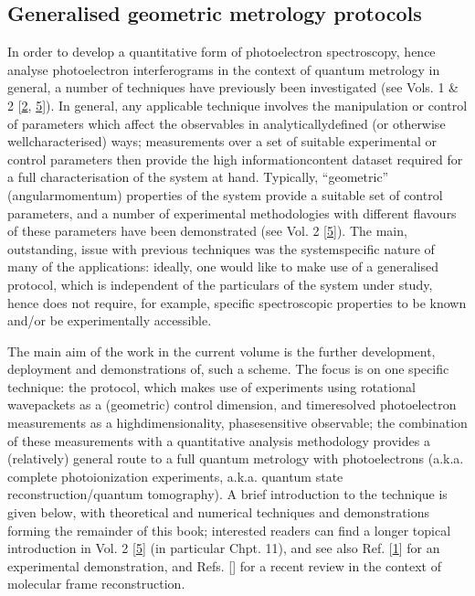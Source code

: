 \documentclass[letterpaper,table,10pt,english]{jupyterBook}
\begin{document}
\subsection{Generalised geometric metrology protocols}
\label{\detokenize{part1/main_intro_060723:generalised-geometric-metrology-protocols}}
\sphinxAtStartPar
In order to develop a quantitative form of photoelectron spectroscopy, hence analyse photoelectron interferograms in the context of quantum metrology in general, a number of techniques have previously been investigated (see  Vols. 1 \& 2 {[}\hyperlink{cite.backmatter/bibliography:id663}{2}, \hyperlink{cite.backmatter/bibliography:id664}{5}{]}). In general, any applicable technique involves the manipulation or control of parameters which affect the observables in analytically\sphinxhyphen{}defined (or otherwise well\sphinxhyphen{}characterised) ways; measurements over a set of suitable experimental or control parameters then provide the high information\sphinxhyphen{}content dataset required for a full characterisation of the system at hand. Typically, “geometric” (angular\sphinxhyphen{}momentum) properties of the system provide a suitable set of control parameters, and a number of experimental methodologies with different flavours of these parameters have been demonstrated (see  Vol. 2 {[}\hyperlink{cite.backmatter/bibliography:id664}{5}{]}). The main, outstanding, issue with previous techniques was the system\sphinxhyphen{}specific nature of many of the applications: ideally, one would like to make use of a generalised protocol, which is independent of the particulars of the system under study, hence does not require, for example, specific spectroscopic properties to be known and/or be experimentally accessible.

\sphinxAtStartPar
The main aim of the work in the current volume is the further development, deployment and demonstrations of, such a scheme. The focus is on one specific  technique: the  protocol, which makes use of experiments using rotational wavepackets as a (geometric) control dimension, and time\sphinxhyphen{}resolved photoelectron measurements as a high\sphinxhyphen{}dimensionality, phase\sphinxhyphen{}sensitive observable; the combination of these measurements with a quantitative analysis methodology provides a (relatively) general route to a full quantum metrology with photoelectrons (a.k.a. complete photoionization experiments, a.k.a. quantum state reconstruction/quantum tomography). A brief introduction to the technique is given below, with theoretical and numerical techniques and demonstrations forming the remainder of this book; interested readers can find a longer topical introduction in  Vol. 2 {[}\hyperlink{cite.backmatter/bibliography:id664}{5}{]} (in particular Chpt. 11), and see also Ref. {[}\hyperlink{cite.backmatter/bibliography:id758}{1}{]} for an experimental demonstration, and Refs. {[}{]} for a recent review in the context of molecular frame reconstruction.
\end{document}
